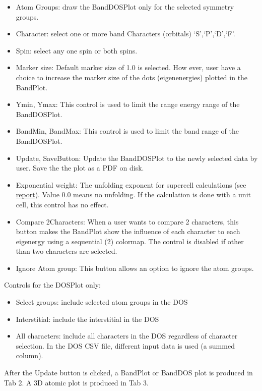 \begin{itemize}
\tightlist
\item
  Atom Groups: draw the BandDOSPlot only for the selected symmetry
  groups.
\item
  Character: select one or more band Characters (orbitals)
  `S',`P',`D',`F'.
\item
  Spin: select any one spin or both spins.
\item
  Marker size: Default marker size of 1.0 is selected. How ever, user
  have a choice to increase the marker size of the dots (eigenenergies)
  plotted in the BandPlot.
\item
  Ymin, Ymax: This control is used to limit the range energy range of
  the BandDOSPlot.
\item
  BandMin, BandMax: This control is used to limit the band range of the
  BandDOSPlot.
\item
  Update, SaveButton: Update the BandDOSPlot to the newly selected data
  by user. Save the the plot as a PDF on disk.
\item
  Exponential weight: The unfolding exponent for supercell calculations
  (see \href{./doc/report.pdf}{report}). Value 0.0 means no unfolding.
  If the calculation is done with a unit cell, this control has no
  effect.
\item
  Compare 2Characters: When a user wants to compare 2 characters, this
  button makes the BandPlot show the influence of each character to each
  eigenergy using a sequential (2) colormap. The control is disabled if
  other than two characters are selected.
\item
  Ignore Atom group: This button allows an option to ignore the atom
  groups.
\end{itemize}

Controls for the DOSPlot only:

\begin{itemize}
\tightlist
\item
  Select groups: include selected atom groups in the DOS
\item
  Interstitial: include the interstitial in the DOS
\item
  All characters: include all characters in the DOS regardless of
  character selection. In the DOS CSV file, different input data is used
  (a summed column).
\end{itemize}

After the Update button is clicked, a BandPlot or BandDOS plot is
produced in Tab 2. A 3D atomic plot is produced in Tab 3.


